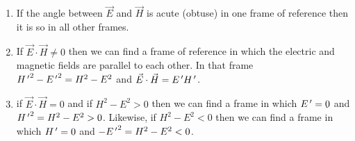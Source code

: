 \begin{enumerate}
\begin{enumerate}
\item If the angle between $\vec{E}$ and $\vec{H}$ is acute (obtuse) in one frame
of reference then it is so in all other frames.

\item If $\vec{E}\cdot\vec{H} \ne 0$ then we can find a frame of reference
in which the electric and magnetic fields are parallel to each other. In that
frame ${H^{\,\prime}}^2 - {E^{\,\prime}}^2 = H^2 - E^2$ and $\vec{E}\cdot\vec{H} = E^{\,\prime} H^{\,\prime}$.

\item if $\vec{E}\cdot\vec{H} = 0$ and if $H^2 - E^2 > 0$ then we can find
a frame in which $E^{\,\prime} = 0$ and ${H^{\,\prime}}^2 = H^2 - E^2 > 0$. Likewise, if $H^2
- E^2 < 0$ then we can find a frame in which $H^{\,\prime} = 0$ and $-{E^{\,\prime}}^2 = H^2 - 
E^2 < 0$. 
\end{enumerate}
\end{enumerate}

